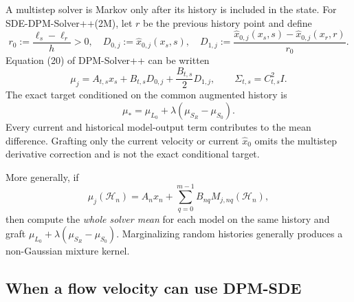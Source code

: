 \documentclass[11pt,a4paper]{article}
\newcommand{\Sbase}{S_0}
\newcommand{\Srl}{S_R}
\newcommand{\Lbase}{L_0}
\theoremstyle{plain}
\theoremstyle{definition}
\begin{document}
A multistep solver is Markov only after its history is included in the state.  For
SDE-DPM-Solver++(2M), let $r$ be the previous history point and define
\begin{equation}
r_0:=\frac{\ell_s-\ell_r}{h}>0,
\quad
D_{0,j}:=\widehat x_{0,j}(x_s,s),
\quad
D_{1,j}:=
\frac{
\widehat x_{0,j}(x_s,s)
-\widehat x_{0,j}(x_r,r)
}{r_0}.
\label{eq:dpm-history-terms}
\end{equation}
Equation (20) of DPM-Solver++ can be written
\begin{equation}
\mu_j
=
A_{t,s}x_s
+B_{t,s}D_{0,j}
+\frac{B_{t,s}}2D_{1,j},
\qquad
\Sigma_{t,s}=C_{t,s}^2I.
\label{eq:dpm-2m-mean}
\end{equation}
The exact target conditioned on the common augmented history is
\begin{equation}
\boxed{
\mu_*
=
\mu_{\Lbase}
+\lambda(\mu_{\Srl}-\mu_{\Sbase}).
}
\label{eq:dpm-2m-target}
\end{equation}
Every current and historical model-output term contributes to the mean difference.  Grafting only
the current velocity or current $\widehat x_0$ omits the multistep derivative correction and is
not the exact conditional target.

More generally, if
\begin{equation}
\mu_j(\mathcal H_n)
=
A_nx_n+\sum_{q=0}^{m-1}B_{nq}M_{j,nq}(\mathcal H_n),
\label{eq:generic-multistep}
\end{equation}
then compute the \emph{whole solver mean} for each model on the same history and graft
$\mu_{\Lbase}+\lambda(\mu_{\Srl}-\mu_{\Sbase})$.  Marginalizing random histories generally
produces a non-Gaussian mixture kernel.

\subsection{When a flow velocity can use DPM-SDE}
\end{document}
